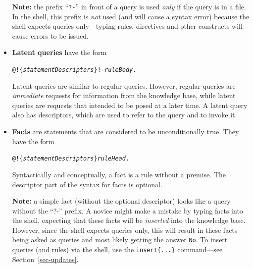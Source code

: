 \documentclass[11pt]{article}
\newcommand{\ERGO}{\mbox{\smaller{\ensuremath{\cal{E}}\smaller{{\sc{RGO}}}}}\xspace}
\newcommand{\FLSYSTEM}{\ERGO}
\begin{document}
\begin{itemize}
  \textbf{Note:} the prefix ``\texttt{?-}'' in front of a query is used
  \emph{only} if the query is in a file. In the \FLSYSTEM shell,
  this prefix is \emph{not} used (and will cause a syntax error)
  because the shell expects queries only---typing rules, directives and
  other constructs will cause errors to be issued.
\item \textbf{Latent queries} have the form
\begin{alltt}
     @!\{\emph{statementDescriptors}\}  !- \emph{ruleBody}.
\end{alltt}
  Latent queries are similar to regular queries. However, regular
  queries are \emph{immediate} requests for information
  from the knowledge base, while latent queries are requests that intended to
  be posed at a later time.  A latent query also has descriptors, which are
  used to refer to the query and to invoke it.
\item \textbf{Facts} are statements that are considered to be
  unconditionally true. They have the form\
\begin{alltt}
     @!\{\emph{statementDescriptors}\}  \emph{ruleHead}.
\end{alltt}
  Syntactically and conceptually, a fact is a rule without a premise.
  The descriptor part of the syntax for facts is optional.

  \textbf{Note:} a simple fact (without the optional descriptor) looks
  like a query without the ``?-'' prefix. A novice might make a mistake
  by typing facts into the \FLSYSTEM shell, expecting that these facts
  will be \emph{inserted} into the knowledge base. However, since the shell
  expects queries only, this will result in these facts being asked as queries
  and most likely getting the answer \texttt{No}. To insert queries (and
  rules) via the \FLSYSTEM shell, use the \texttt{insert\{...\}}
  command---see Section~\ref{sec-updates}.
\end{itemize}
\end{document}
